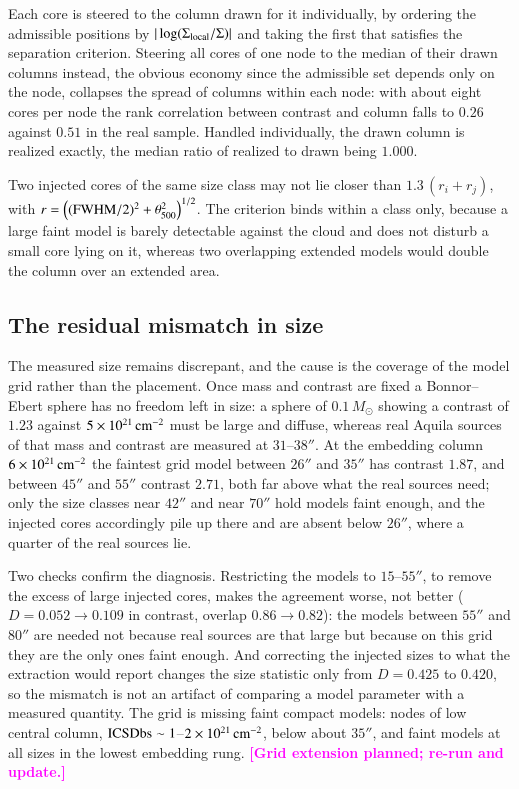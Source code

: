 \documentclass{aa}
\newcommand{\draftnote}[1]{\textcolor{magenta}{\textbf{[#1]}}}
\newcommand{\msun}{M_{\odot}}
\begin{document}
Each core is steered to the column drawn for it individually, by ordering the
admissible positions by $|\log(\Sigma_{\rm local}/\Sigma)|$ and taking
the first that satisfies the separation criterion. Steering all cores of one
node to the median of their drawn columns instead, the obvious economy since
the admissible set depends only on the node, collapses the spread of columns
within each node: with about eight cores per node the rank correlation between
contrast and column falls to $0.26$ against $0.51$ in the real sample. Handled
individually, the drawn column is realized exactly, the median ratio of
realized to drawn being $1.000$.

Two injected cores of the same size class may not lie closer than
$1.3\,(r_{i}+r_{j})$, with
$r=\left(({\rm FWHM}/2)^{2}+\theta_{500}^{2}\right)^{1/2}$. The criterion binds within
a class only, because a large faint model is barely detectable against the
cloud and does not disturb a small core lying on it, whereas two overlapping
extended models would double the column over an extended area.

\subsection{The residual mismatch in size}
The measured size remains discrepant, and the
cause is the coverage of the model grid rather than the placement. Once mass
and contrast are fixed a Bonnor--Ebert sphere has no freedom left in size: a
sphere of $0.1\,\msun$ showing a contrast of $1.23$ against
$5\times10^{21}\,{\rm cm^{-2}}$ must be large and diffuse, whereas real
Aquila sources of that mass and contrast are measured at $31$--$38''$. At the
embedding column $6\times10^{21}\,{\rm cm^{-2}}$ the faintest grid model
between $26''$ and $35''$ has contrast $1.87$, and between $45''$ and $55''$
contrast $2.71$, both far above what the real sources need; only the size
classes near $42''$ and near $70''$ hold models faint enough, and the injected
cores accordingly pile up there and are absent below $26''$, where a quarter
of the real sources lie.

Two checks confirm the diagnosis. Restricting the models to $15$--$55''$, to
remove the excess of large injected cores, makes the agreement worse, not
better ($D=0.052\to0.109$ in contrast, overlap $0.86\to0.82$): the models
between $55''$ and $80''$ are needed not because real sources are that large
but because on this grid they are the only ones faint enough. And correcting
the injected sizes to what the extraction would report changes the size
statistic only from $D=0.425$ to $0.420$, so the mismatch is not an artifact
of comparing a model parameter with a measured quantity. The grid is missing
faint compact models: nodes of low central column,
${\rm ICSDbs}\sim1$--$2\times10^{21}\,{\rm cm^{-2}}$, below about
$35''$, and faint models at all sizes in the lowest embedding rung.
\draftnote{Grid extension planned; re-run and update.}
\end{document}

